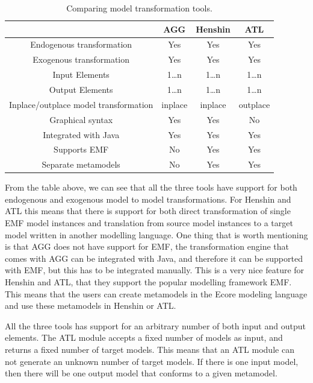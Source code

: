 \documentclass[pdftex,11pt,a4paper]{article}
\begin{document}
\begin{table}[ht]
\centering
\begin{tabular}{| c | c | c | c |}
\hline
 & AGG & Henshin & ATL \\
\hline
Endogenous transformation & \cellcolor{green!25}Yes &
\cellcolor{green!25}Yes & \cellcolor{green!25}Yes \\

Exogenous transformation & \cellcolor{green!25}Yes &
\cellcolor{green!25}Yes & \cellcolor{green!25}Yes \\

Input Elements & 1\ldots n & 1\ldots n & 1\ldots n\\
Output Elements & 1\ldots n & 1\ldots n & 1\ldots n\\
Inplace/outplace model transformation &inplace &
inplace &outplace \\
Graphical syntax &\cellcolor{green!25}Yes &
\cellcolor{green!25}Yes &\cellcolor{red!25}No  \\
Integrated with Java & \cellcolor{green!25}Yes &
\cellcolor{green!25}Yes & \cellcolor{green!25}Yes \\
Supports EMF & \cellcolor{red!25}No &
\cellcolor{green!25}Yes & \cellcolor{green!25}Yes \\
Separate metamodels & \cellcolor{red!25}No &
\cellcolor{green!25}Yes & \cellcolor{green!25}Yes \\
\hline

\end{tabular}
\caption{Comparing model transformation tools.}
\end{table}

From the table above, we can see that all the three tools have support for both
endogenous and exogenous model to model transformations. For Henshin and ATL
this means that there is support for both direct transformation of single EMF
model instances and translation from source model instances to a target model
written in another modelling language. One thing that is worth mentioning is
that AGG does not have support for EMF, the transformation engine that comes
with AGG can be integrated with Java, and therefore it can be supported with
EMF, but this has to be integrated manually. This is a very nice feature for
Henshin and ATL, that they support the popular modelling framework EMF. This
means that the users can create metamodels in the Ecore modeling language and
use these metamodels in Henshin or ATL. 

All the three tools has support for an arbitrary number of both input and output
elements. The ATL module accepts a fixed number of models as input, and returns
a fixed number of target models. This means that an ATL module can not generate
an unknown number of target models. If there is one input model, then there
will be one output model that conforms to a given metamodel.
\end{document}
